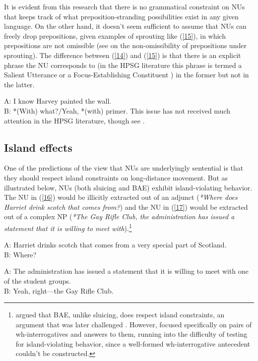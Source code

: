 \documentclass[output=paper
	        ,collection
	        ,collectionchapter
 	        ,biblatex
                ,babelshorthands
                ,newtxmath
                ,draftmode
                ,colorlinks, citecolor=brown
]{langscibook}
\begin{document}
{It is evident from this research that there is no grammatical constraint on NUs that keeps track of what preposition-stranding possibilities exist in any given language. On the other hand, it doesn't seem sufficient to assume that NUs can freely drop prepositions, given examples of sprouting like (\ref{15}), in which prepositions are not omissible (see \citealt{Chung1995} on the non-omissibility of prepositions under sprouting). The difference between (\ref{14}) and (\ref{15}) is that there is an explicit phrase the NU corresponds to (in the HPSG literature this phrase is termed a Salient Utterance \citep[313]{Ginzburg:Sag:2000} or a Focus-Establishing Constituent \citealt{Ginzburg2012}) in the former but not in the latter.

\ea A: I know Harvey painted the wall.\\B: *(With) what?/Yeah, *(with) primer.\label{15}\z
This issue has not received much attention in the HPSG literature, though see \citet{Kim2015}.


\subsection{Island effects}
One of the predictions of the view that NUs are underlyingly sentential is that they should respect island constraints on long-distance movement. But as illustrated below, NUs (both sluicing and BAE) exhibit island-violating behavior. The NU in (\ref{16}) would be illicitly extracted out of an adjunct (\textit{*Where does Harriet drink scotch that comes from?}) and the NU in (\ref{17}) would be extracted out of a complex NP (\textit{*The Gay Rifle Club, the administration has issued a statement that it is willing to meet with}).\footnote{\citet{Merchant2005a} argued that BAE, unlike sluicing, does respect island constraints, an argument that was later challenged \citep[see e.g,][]{CJ2005a, Griffiths2014}. However, \citet{Merchant2005-proc} focused specifically on pairs of wh-interrogatives and answers to them, running into the difficulty of testing for island-violating behavior, since a well-formed wh-interrogative antecedent couldn't be constructed.}

\ea A: Harriet drinks scotch that comes from a very special part of Scotland.\\B: Where? \citep[245]{CJ2005a} \label{16}\z

\ea A: The administration has issued a statement that it is willing to meet with one of the student groups.\\B: Yeah, right---the Gay Rifle Club. \citep[245]{CJ2005a} \label{17}\z

}
\end{document}
